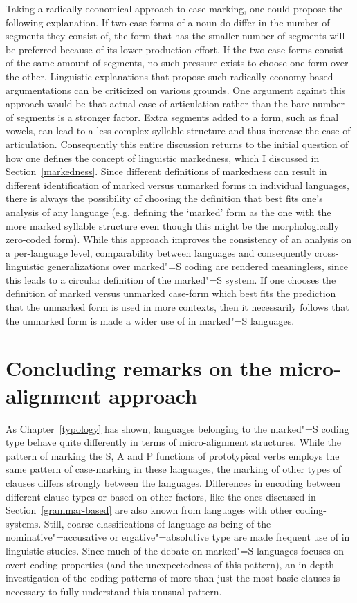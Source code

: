 Taking a radically economical approach to case-marking, one could propose the following explanation. 
If two case-forms of a noun do differ in the number of segments they consist of, the form that has the smaller number of segments will be preferred because of its lower production effort. 
If the two case-forms consist of the same amount of segments, no such pressure exists to choose one form over the other. 
Linguistic explanations that propose such radically economy-based argumentations can be criticized on various grounds. 
One argument against this approach would be that actual ease of articulation rather than the bare number of segments is a stronger factor. 
Extra segments added to a form, such as final vowels, can lead  to a less complex syllable structure and thus increase the ease of articulation. 
Consequently this entire discussion returns to the initial question of how one defines the concept of linguistic markedness, which I discussed in Section~\ref{markedness}. 
Since different definitions of markedness can result in different identification of marked versus unmarked forms in individual languages, there is always the possibility of choosing the definition that best fits one's analysis of any language (e.g. defining the `marked' form as the one with the more marked syllable structure even though this might be the morphologically zero-coded form). 
While this approach improves the consistency of an analysis on a per-language level, comparability between languages and consequently cross-linguistic generalizations over marked"=S coding are rendered meaningless, since this leads to a circular definition of the marked"=S system. 
If one chooses the definition of marked versus unmarked case-form which best fits the prediction that the unmarked form is used in more contexts, then it necessarily follows that the unmarked form is made a wider use of in marked"=S languages. 

\section{Concluding remarks on the micro-alignment approach}\label{methodcomments}

As Chapter~\ref{typology} has shown, languages belonging to the marked"=S coding type behave quite differently in terms of micro-alignment structures. 
While the pattern of marking the S, A and P functions of prototypical verbs employs the same pattern of case-marking in these languages, the marking of other types of clauses differs strongly between the languages. 
Differences in encoding between different clause-types or based on other factors, like the ones discussed in Section~\ref{grammar-based} are also known from languages with other coding-systems. 
Still, coarse classifications of language as being of the nominative"=accusative or ergative"=absolutive type are made frequent use of in linguistic studies.
Since much of the debate on marked"=S languages focuses on overt coding properties (and the unexpectedness of this pattern), an in-depth investigation of the coding-patterns of more than just the most basic clauses is necessary to fully understand this unusual pattern.  

